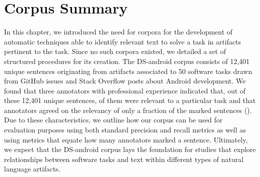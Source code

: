 
\section{Corpus Summary}
\label{cp4:corpus-summary}

In this chapter, we introduced the need for corpora 
for the development of 
automatic techniques able to identify relevant text
to solve a task in artifacts
pertinent to the task.
Since  no such corpora
existed, we detailed 
a set of structured procedures for its creation. 
The \acs{DS-android} corpus consists of  
12,401 unique sentences
originating from artifacts associated to 50 software tasks
drawn from GitHub issues and Stack Overflow posts about Android development. 
We found that 
three annotators with professional experience indicated that,
out of these 12,401 unique sentences, 
 of them were relevant to a particular task and that 
annotators agreed on the relevancy of  
only a fraction of the marked sentences ().
Due to these characteristics, 
we outline how our corpus can be used for evaluation purposes 
using both standard precision and recall metrics as well as using
metrics that equate how many annotators marked a sentence. 
Ultimately, we expect that the \acs{DS-android} corpus
lays the foundation for studies that explore relationships between software tasks
and text within different types of natural language artifacts.



